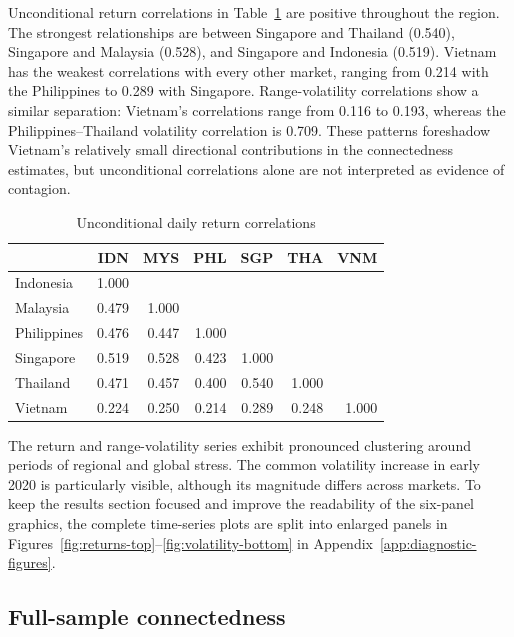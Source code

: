 \documentclass[12pt,a4paper]{article}
\begin{document}
Unconditional return correlations in Table~\ref{tab:correlations} are positive throughout the region. The strongest relationships are between Singapore and Thailand (0.540), Singapore and Malaysia (0.528), and Singapore and Indonesia (0.519). Vietnam has the weakest correlations with every other market, ranging from 0.214 with the Philippines to 0.289 with Singapore. Range-volatility correlations show a similar separation: Vietnam's correlations range from 0.116 to 0.193, whereas the Philippines--Thailand volatility correlation is 0.709. These patterns foreshadow Vietnam's relatively small directional contributions in the connectedness estimates, but unconditional correlations alone are not interpreted as evidence of contagion.

\begin{table}[H]
\centering
\caption{Unconditional daily return correlations}
\label{tab:correlations}
\begin{tabular}{lrrrrrr}
\toprule
 & IDN & MYS & PHL & SGP & THA & VNM \\
\midrule
Indonesia   & 1.000 &       &       &       &       &       \\
Malaysia    & 0.479 & 1.000 &       &       &       &       \\
Philippines & 0.476 & 0.447 & 1.000 &       &       &       \\
Singapore   & 0.519 & 0.528 & 0.423 & 1.000 &       &       \\
Thailand    & 0.471 & 0.457 & 0.400 & 0.540 & 1.000 &       \\
Vietnam     & 0.224 & 0.250 & 0.214 & 0.289 & 0.248 & 1.000 \\
\bottomrule
\end{tabular}
\end{table}

The return and range-volatility series exhibit pronounced clustering around periods of regional and global stress. The common volatility increase in early 2020 is particularly visible, although its magnitude differs across markets. To keep the results section focused and improve the readability of the six-panel graphics, the complete time-series plots are split into enlarged panels in Figures~\ref{fig:returns-top}--\ref{fig:volatility-bottom} in Appendix~\ref{app:diagnostic-figures}.

\subsection{Full-sample connectedness}
\end{document}
